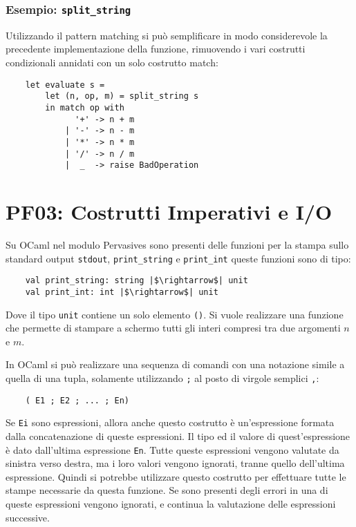 \documentclass{article}
\numberwithin{equation}{subsection}
\begin{document}
\subsubsection*{Esempio: \texttt{split\_string}}

Utilizzando il pattern matching si può semplificare in modo considerevole la precedente implementazione della funzione, rimuovendo i vari costrutti condizionali annidati con un solo costrutto match:
\begin{verbatim}
    let evaluate s = 
        let (n, op, m) = split_string s
        in match op with
              '+' -> n + m
            | '-' -> n - m
            | '*' -> n * m
            | '/' -> n / m
            |  _  -> raise BadOperation    
\end{verbatim}

\clearpage

\section{PF03: Costrutti Imperativi e I/O}

Su OCaml nel modulo Pervasives sono presenti delle funzioni per la stampa sullo standard output \verb|stdout|, \verb|print_string| e \verb|print_int| queste funzioni sono di tipo: 
\begin{verbatim}
    val print_string: string |$\rightarrow$| unit
    val print_int: int |$\rightarrow$| unit
\end{verbatim}
Dove il tipo \verb|unit| contiene un solo elemento \verb|()|. Si vuole realizzare una funzione che permette di stampare a schermo tutti gli interi compresi tra due argomenti $n$ e $m$. 


In OCaml si può realizzare una sequenza di comandi con una notazione simile a quella di una tupla, solamente utilizzando \verb|;| al posto di virgole semplici \verb|,|:
\begin{verbatim}
    ( E1 ; E2 ; ... ; En)
\end{verbatim}
Se \verb|Ei| sono espressioni, allora anche questo costrutto è un'espressione formata dalla concatenazione di queste espressioni. Il tipo ed il valore di quest'espressione è dato dall'ultima espressione \verb|En|. Tutte queste espressioni vengono valutate da sinistra verso destra, ma i loro valori vengono ignorati, tranne quello dell'ultima espressione. 
Quindi si potrebbe utilizzare questo costrutto per effettuare tutte le stampe necessarie da questa funzione. 
Se sono presenti degli errori in una di queste espressioni vengono ignorati, e continua la valutazione delle espressioni successive. 
\end{document}
